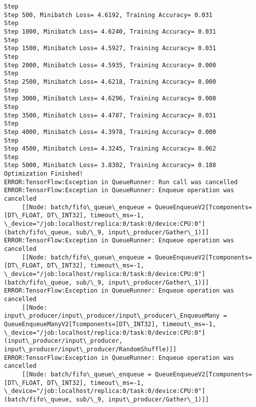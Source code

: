 \documentclass[11pt]{article}
\begin{document}
    \begin{Verbatim}[commandchars=\\\{\}]
Step
Step 500, Minibatch Loss= 4.6192, Training Accuracy= 0.031
Step
Step 1000, Minibatch Loss= 4.6240, Training Accuracy= 0.031
Step
Step 1500, Minibatch Loss= 4.5927, Training Accuracy= 0.031
Step
Step 2000, Minibatch Loss= 4.5935, Training Accuracy= 0.000
Step
Step 2500, Minibatch Loss= 4.6218, Training Accuracy= 0.000
Step
Step 3000, Minibatch Loss= 4.6296, Training Accuracy= 0.000
Step
Step 3500, Minibatch Loss= 4.4787, Training Accuracy= 0.031
Step
Step 4000, Minibatch Loss= 4.3978, Training Accuracy= 0.000
Step
Step 4500, Minibatch Loss= 4.3245, Training Accuracy= 0.062
Step
Step 5000, Minibatch Loss= 3.8302, Training Accuracy= 0.188
Optimization Finished!
ERROR:TensorFlow:Exception in QueueRunner: Run call was cancelled
ERROR:TensorFlow:Exception in QueueRunner: Enqueue operation was cancelled
	 [[Node: batch/fifo\_queue\_enqueue = QueueEnqueueV2[Tcomponents=[DT\_FLOAT, DT\_INT32], timeout\_ms=-1, \_device="/job:localhost/replica:0/task:0/device:CPU:0"](batch/fifo\_queue, sub/\_9, input\_producer/Gather\_1)]]
ERROR:TensorFlow:Exception in QueueRunner: Enqueue operation was cancelled
	 [[Node: batch/fifo\_queue\_enqueue = QueueEnqueueV2[Tcomponents=[DT\_FLOAT, DT\_INT32], timeout\_ms=-1, \_device="/job:localhost/replica:0/task:0/device:CPU:0"](batch/fifo\_queue, sub/\_9, input\_producer/Gather\_1)]]
ERROR:TensorFlow:Exception in QueueRunner: Enqueue operation was cancelled
	 [[Node: input\_producer/input\_producer/input\_producer\_EnqueueMany = QueueEnqueueManyV2[Tcomponents=[DT\_INT32], timeout\_ms=-1, \_device="/job:localhost/replica:0/task:0/device:CPU:0"](input\_producer/input\_producer, input\_producer/input\_producer/RandomShuffle)]]
ERROR:TensorFlow:Exception in QueueRunner: Enqueue operation was cancelled
	 [[Node: batch/fifo\_queue\_enqueue = QueueEnqueueV2[Tcomponents=[DT\_FLOAT, DT\_INT32], timeout\_ms=-1, \_device="/job:localhost/replica:0/task:0/device:CPU:0"](batch/fifo\_queue, sub/\_9, input\_producer/Gather\_1)]]

    \end{Verbatim}
\end{document}
